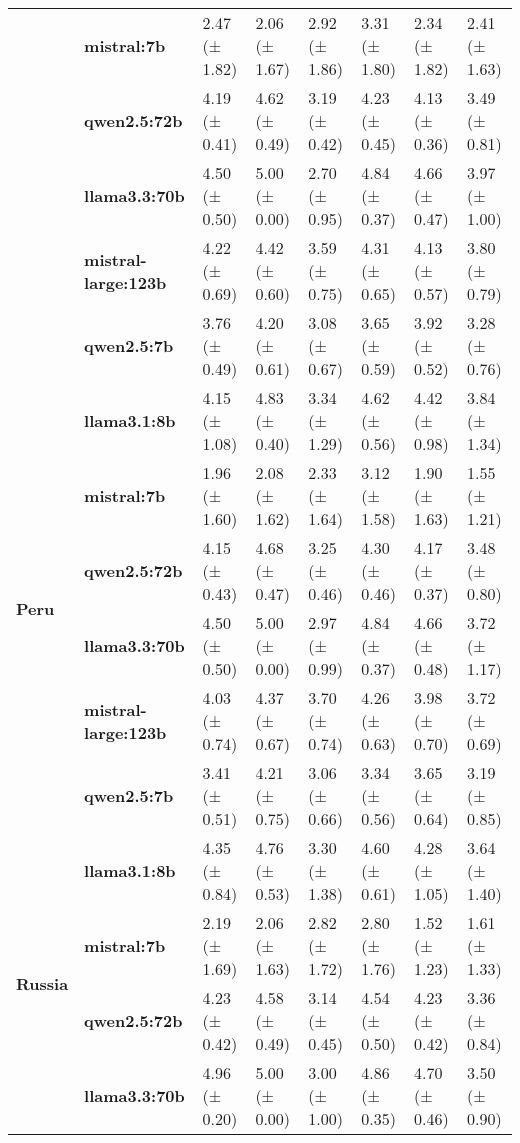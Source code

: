 \begin{tabular}{llllllll}
\textbf{} & \textbf{mistral:7b} & 2.47 (± 1.82) & 2.06 (± 1.67) & 2.92 (± 1.86) & 3.31 (± 1.80) & 2.34 (± 1.82) & 2.41 (± 1.63) \\
\textbf{} & \textbf{qwen2.5:72b} & 4.19 (± 0.41) & 4.62 (± 0.49) & 3.19 (± 0.42) & 4.23 (± 0.45) & 4.13 (± 0.36) & 3.49 (± 0.81) \\
\textbf{} & \textbf{llama3.3:70b} & 4.50 (± 0.50) & 5.00 (± 0.00) & 2.70 (± 0.95) & 4.84 (± 0.37) & 4.66 (± 0.47) & 3.97 (± 1.00) \\
\textbf{} & \textbf{mistral-large:123b} & 4.22 (± 0.69) & 4.42 (± 0.60) & 3.59 (± 0.75) & 4.31 (± 0.65) & 4.13 (± 0.57) & 3.80 (± 0.79) \\
\textbf{} & \textbf{qwen2.5:7b} & 3.76 (± 0.49) & 4.20 (± 0.61) & 3.08 (± 0.67) & 3.65 (± 0.59) & 3.92 (± 0.52) & 3.28 (± 0.76) \\
\cline{1-8}
\multirow[t]{6}{*}{\textbf{Peru}} & \textbf{llama3.1:8b} & 4.15 (± 1.08) & 4.83 (± 0.40) & 3.34 (± 1.29) & 4.62 (± 0.56) & 4.42 (± 0.98) & 3.84 (± 1.34) \\
\textbf{} & \textbf{mistral:7b} & 1.96 (± 1.60) & 2.08 (± 1.62) & 2.33 (± 1.64) & 3.12 (± 1.58) & 1.90 (± 1.63) & 1.55 (± 1.21) \\
\textbf{} & \textbf{qwen2.5:72b} & 4.15 (± 0.43) & 4.68 (± 0.47) & 3.25 (± 0.46) & 4.30 (± 0.46) & 4.17 (± 0.37) & 3.48 (± 0.80) \\
\textbf{} & \textbf{llama3.3:70b} & 4.50 (± 0.50) & 5.00 (± 0.00) & 2.97 (± 0.99) & 4.84 (± 0.37) & 4.66 (± 0.48) & 3.72 (± 1.17) \\
\textbf{} & \textbf{mistral-large:123b} & 4.03 (± 0.74) & 4.37 (± 0.67) & 3.70 (± 0.74) & 4.26 (± 0.63) & 3.98 (± 0.70) & 3.72 (± 0.69) \\
\textbf{} & \textbf{qwen2.5:7b} & 3.41 (± 0.51) & 4.21 (± 0.75) & 3.06 (± 0.66) & 3.34 (± 0.56) & 3.65 (± 0.64) & 3.19 (± 0.85) \\
\cline{1-8}
\multirow[t]{6}{*}{\textbf{Russia}} & \textbf{llama3.1:8b} & 4.35 (± 0.84) & 4.76 (± 0.53) & 3.30 (± 1.38) & 4.60 (± 0.61) & 4.28 (± 1.05) & 3.64 (± 1.40) \\
\textbf{} & \textbf{mistral:7b} & 2.19 (± 1.69) & 2.06 (± 1.63) & 2.82 (± 1.72) & 2.80 (± 1.76) & 1.52 (± 1.23) & 1.61 (± 1.33) \\
\textbf{} & \textbf{qwen2.5:72b} & 4.23 (± 0.42) & 4.58 (± 0.49) & 3.14 (± 0.45) & 4.54 (± 0.50) & 4.23 (± 0.42) & 3.36 (± 0.84) \\
\textbf{} & \textbf{llama3.3:70b} & 4.96 (± 0.20) & 5.00 (± 0.00) & 3.00 (± 1.00) & 4.86 (± 0.35) & 4.70 (± 0.46) & 3.50 (± 0.90) \\

\end{tabular}
